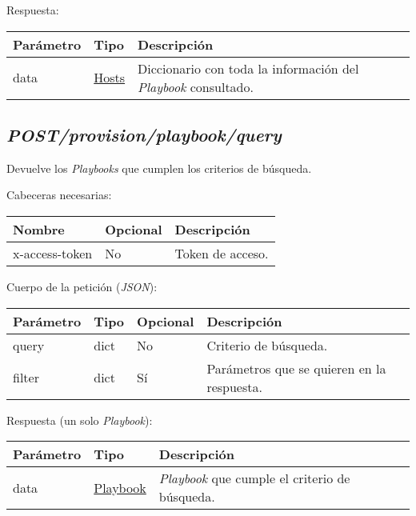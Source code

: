 		Respuesta:
		\begin{table}[h!]
			\centering
	\begin{adjustbox}{max width=\textwidth}
			\begin{tabularx}{\linewidth}{|l|l|L|}
				\hline
				Parámetro & Tipo & Descripción \\ \hline
				data & \hyperref[sec:hosts]{Hosts} & Diccionario con toda la información del \textit{Playbook} consultado. \\ \hline
			\end{tabularx}
\end{adjustbox}
		\end{table}
	
	
	
	\pagebreak
	\subsection{\textit{POST/provision/playbook/query}}
		Devuelve los \textit{Playbooks} que cumplen los criterios de búsqueda.
		
		Cabeceras necesarias:
		\begin{table}[h!]
			\centering
	\begin{adjustbox}{max width=\textwidth}
			\begin{tabular}{|l|l|l|}
				\hline
				Nombre & Opcional & Descripción \\ \hline
				x-access-token & No & Token de acceso. \\ \hline
			\end{tabular}
\end{adjustbox}
		\end{table}
		
		Cuerpo de la petición (\textit{JSON}):
		\begin{table}[h!]
			\centering
	\begin{adjustbox}{max width=\textwidth}
			\begin{tabular}{|l|l|l|l|}
				\hline
				Parámetro & Tipo & Opcional & Descripción \\ \hline
				query & dict & No & Criterio de búsqueda. \\ \hline
				filter & dict & Sí & Parámetros que se quieren en la respuesta. \\ \hline
			\end{tabular}
\end{adjustbox}
		\end{table}
		
		
		Respuesta (un solo \textit{Playbook}):
		\begin{table}[h!]
			\centering
	\begin{adjustbox}{max width=\textwidth}
			\begin{tabular}{|l|l|l|}
				\hline
				Parámetro & Tipo & Descripción \\ \hline
				data & \hyperref[sec:playbook]{Playbook} & \textit{Playbook} que cumple el criterio de búsqueda. \\ \hline
			\end{tabular}
\end{adjustbox}
		\end{table}
		
